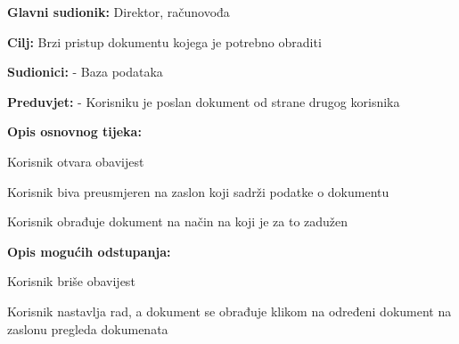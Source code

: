 					\noindent {}
						\begin{packed_item}
		
							\item \textbf{Glavni sudionik:} Direktor, računovođa
							\item  \textbf{Cilj:} Brzi pristup dokumentu kojega je potrebno obraditi
							\item  \textbf{Sudionici:} - Baza podataka
							\item  \textbf{Preduvjet:} - Korisniku je poslan dokument od strane drugog korisnika
							\item  \textbf{Opis osnovnog tijeka:}
							
							\item[] \begin{packed_enum}
								\item Korisnik otvara obavijest
								\item Korisnik biva preusmjeren na zaslon koji sadrži podatke o dokumentu
								\item Korisnik obrađuje dokument na način na koji je za to zadužen
							\end{packed_enum}
							
							\item  \textbf{Opis mogućih odstupanja:}
							
							\item[] \begin{packed_item}
		
								\item[1.a]Korisnik briše obavijest
								\item[] \begin{packed_enum}
									\item Korisnik nastavlja rad, a dokument se obrađuje klikom na određeni dokument na zaslonu pregleda dokumenata
								\end{packed_enum}
							\end{packed_item}
						\end{packed_item}


